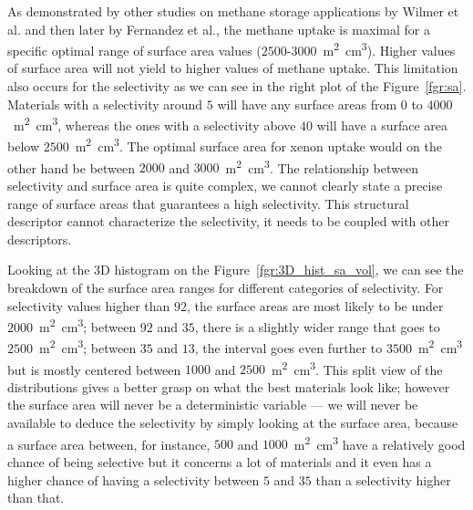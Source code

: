 \documentclass[main.tex]{subfiles}
\begin{document}
As demonstrated by other studies on methane storage applications by Wilmer et al.\cite{Wilmer_2012} and then later by Fernandez et al.\cite{Fernandez_2013}, the methane uptake is maximal for a specific optimal range of surface area values ($2500$-$3000$~\si{\square\meter\cubic\centi\meter}). Higher values of surface area will not yield to higher values of methane uptake. This limitation also occurs for the selectivity as we can see in the right plot of the Figure~\ref{fgr:sa}. Materials with a selectivity around $5$ will have any surface areas from $0$ to $4000$~\si{\square\meter\cubic\centi\meter}, whereas the ones with a selectivity above $40$ will have a surface area below $2500$~\si{\square\meter\cubic\centi\meter}. The optimal surface area for xenon uptake would on the other hand be between $2000$ and $3000$~\si{\square\meter\cubic\centi\meter}. The relationship between selectivity and surface area is quite complex, we cannot clearly state a precise range of surface areas that guarantees a high selectivity. This structural descriptor cannot characterize the selectivity, it needs to be coupled with other descriptors. 

Looking at the 3D histogram on the Figure~\ref{fgr:3D_hist_sa_vol}, we can see the breakdown of the surface area ranges for different categories of selectivity. For selectivity values higher than $92$, the surface areas are most likely to be under $2000$~\si{\square\meter\cubic\centi\meter}; between $92$ and $35$, there is a slightly wider range that goes to $2500$~\si{\square\meter\cubic\centi\meter}; between $35$ and $13$, the interval goes even further to $3500$~\si{\square\meter\cubic\centi\meter} but is mostly centered between $1000$ and $2500$~\si{\square\meter\cubic\centi\meter}. This split view of the distributions gives a better grasp on what the best materials look like; however the surface area will never be a deterministic variable --- we will never be available to deduce the selectivity by simply looking at the surface area, because a surface area between, for instance, $500$ and $1000$~\si{\square\meter\cubic\centi\meter} have a relatively good chance of being selective but it concerns a lot of materials and it even has a higher chance of having a selectivity between $5$ and $35$ than a selectivity higher than that. 
\end{document}
